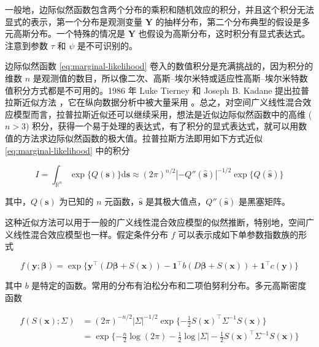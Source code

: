 \documentclass[12pt,a4paper,UTF8,twoside]{book}
\theoremstyle{definition}
\theoremstyle{definition}
\theoremstyle{definition}
\theoremstyle{remark}
\begin{document}
一般地，边际似然函数包含两个分布的乘积和随机效应的积分，并且这个积分无法显式的表示，第一个分布是观测变量
\(\mathbf{Y}\)
的抽样分布，第二个分布典型的假设是多元高斯分布。一个特殊的情况是
\(\mathbf{Y}\) 也假设为高斯分布，这时积分有显式表达式。注意到参数
\(\tau\) 和 \(\psi\) 是不可识别的。

边际似然函数 \eqref{eq:marginal-likelihood}
卷入的数值积分是充满挑战的，因为积分的维数 \(n\)
是观测值的数目，所以像二次、高斯--埃尔米特或适应性高斯--埃尔米特数值积分方式都是不可用的。1986
年 Luke Tierney 和 Joseph B. Kadane 提出拉普拉斯近似方法
\citep{Tierney1986}，它在纵向数据分析中被大量采用
\citep{Diggle2002Analysis}。总之，对空间广义线性混合效应模型而言，拉普拉斯近似还可以继续采用，想法是近似边际似然函数中的高维
(\(n > 3\))
积分，获得一个易于处理的表达式，有了积分的显式表达式，就可以用数值的方法求边际似然函数的极大值。拉普拉斯方法即用如下方式近似
\eqref{eq:marginal-likelihood} 中的积分

\begin{equation}
I   =  \int_{\mathbb{R}^n} \exp\{Q(\mathbf{s})\}\mathrm{d}\mathbf{s} 
  \approx  (2\pi)^{n/2} |-Q''(\hat{\mathbf{s}})|^{-1/2}\exp\{Q(\hat{\mathbf{s}})\} \label{eq:laplace-approximate}
\end{equation}

其中，\(Q(\mathbf{s})\) 为已知的 \(n\) 元函数，\(\hat{\mathbf{s}}\)
是其极大值点，\(Q''(\hat{\mathbf{s}})\) 是黑塞矩阵。

这种近似方法可以用于一般的广义线性混合效应模型的似然推断，特别地，空间广义线性混合效应模型也一样。假定条件分布
\(f\) 可以表示成如下单参数指数族的形式

\begin{equation}
f(\mathbf{y};\boldsymbol{\beta})  = \exp\{\mathbf{y}^{\top} (D\boldsymbol{\beta} + S(\mathbf{x})) - \mathbf{1}^{\top} b( D\boldsymbol{\beta} + S(\mathbf{x})) + \mathbf{1}^{\top} c(\mathbf{y}) \}  \label{eq:exponential-family}
\end{equation}

其中 \(b\)
是特定的函数。常用的分布有泊松分布和二项伯努利分布。多元高斯密度函数

\begin{align}
f(S(\mathbf{x});\Sigma) & = (2\pi)^{-n/2}|\Sigma|^{-1/2} \exp\{ -\frac{1}{2}S(\mathbf{x})^{\top} \Sigma^{-1} S(\mathbf{x}) \} \\
                      & = \exp\{ - \frac{n}{2}\log (2\pi) -\frac{1}{2}\log |\Sigma|  -\frac{1}{2}S(\mathbf{x})^{\top} \Sigma^{-1} S(\mathbf{x}) \} \label{eq:multi-gaussian-dist}
\end{align}
\end{document}
